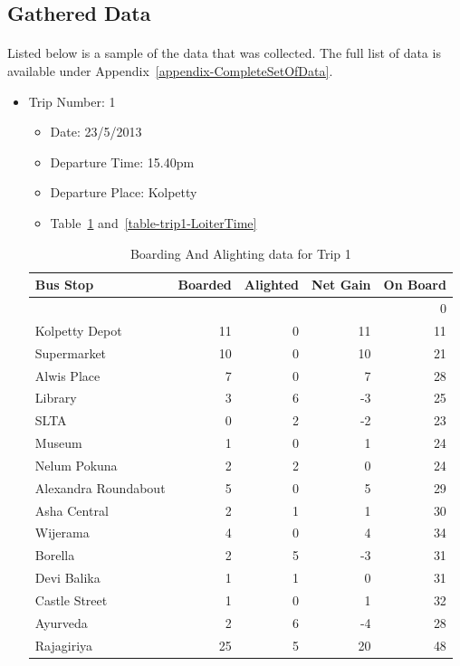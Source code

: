 \subsection {Gathered Data}
\label {GatheredData}

\paragraph{ } Listed below is a sample of the data that was collected. The full list of data is available under Appendix~\ref{appendix-CompleteSetOfData}.

\begin{itemize}

\item Trip Number: 1
\begin{itemize}
\item Date: 23/5/2013
\item Departure Time: 15.40pm
\item Departure Place: Kolpetty
\item Table~\ref{table-trip1-BoardingAndAlighting} and~\ref{table-trip1-LoiterTime}
\end{itemize}
\begin{table}[H]
\centering
\begin{tabular}{|l|r|r|r|r|}
\hline
Bus Stop & Boarded & Alighted & Net Gain & On Board \\
\hline
 & & & & 0 \\
Kolpetty Depot	&11	&0	&11	&11\\
Supermarket	&10	&0	&10	&21\\
Alwis Place	&7	&0	&7	&28\\
Library	&3	&6	&-3	&25\\
SLTA	&0	&2	&-2	&23\\
\rowcolor[gray]{0.7}
Museum	&1	&0	&1	&24\\
Nelum Pokuna	&2	&2	&0	&24\\
\rowcolor[gray]{0.7}
Alexandra Roundabout	&5	&0	&5	&29\\
Asha Central	&2	&1	&1	&30\\
Wijerama	&4	&0	&4	&34\\
Borella	&2	&5	&-3	&31\\
Devi Balika	&1	&1	&0	&31\\
Castle Street	&1	&0	&1	&32\\
Ayurveda	&2	&6	&-4	&28\\
Rajagiriya	&25	&5	&20	&48\\
\hline
\end{tabular}
\caption{Boarding And Alighting data for Trip 1}
\label{table-trip1-BoardingAndAlighting}
\end{table}


\end{itemize}
